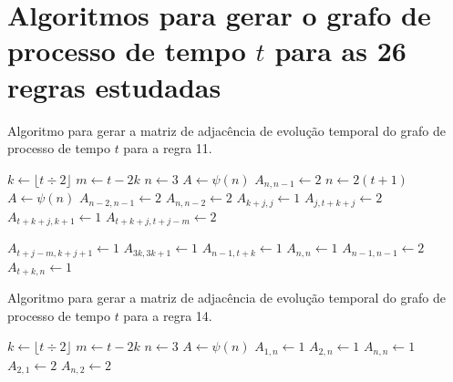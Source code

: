 \documentclass[12pt,a4paper]{article}
\begin{document}
\newpage

\def\refname{Referências bibliográficas}



\appendix
\section{Algoritmos para gerar o grafo de processo de tempo $t$ para as 26 regras
estudadas}\label{sec:algorithms}

\begin{algorithm}[H]
\caption{Algoritmo para gerar a matriz de adjacência de evolução temporal do
grafo de processo de tempo $t$ para a regra 11.}
\label{alg:r11}
\begin{algorithmic}
\STATE $k \leftarrow \lfloor t \div 2 \rfloor$
\STATE $m \leftarrow t-2k$
    \STATE $n \leftarrow 3$
    \STATE $A \leftarrow \psi(n)$
    \STATE $A_{n,n-1} \leftarrow 2$
\ELSE
    \STATE $n \leftarrow 2(t+1)$
    \STATE $A \leftarrow \psi(n)$
    \STATE $A_{n-2,n-1} \leftarrow 2$
    \STATE $A_{n,n-2} \leftarrow 2$
        \STATE $A_{k+j,j} \leftarrow 1$
        \STATE $A_{j,t+k+j} \leftarrow 2$
    \ENDFOR
        \STATE $A_{t+k+j,k+1} \leftarrow 1$
    \ENDFOR
            \STATE $A_{t+k+j,t+j-m} \leftarrow 2$
        \ENDFOR
    \ENDIF
{}
\end{algorithmic}
\end{algorithm}

\begin{algorithm}[H]
\begin{algorithmic}
            \STATE $A_{t+j-m,k+j+1} \leftarrow 1$
        \ENDFOR
    \ENDIF
        \STATE $A_{3k,3k+1} \leftarrow 1$
    \ENDIF
\ENDIF
\STATE $A_{n-1,t+k} \leftarrow 1$
\STATE $A_{n,n} \leftarrow 1$
\STATE $A_{n-1,n-1} \leftarrow 2$
\STATE $A_{t+k,n} \leftarrow 1$
\end{algorithmic}
\end{algorithm}

\begin{algorithm}[H]
\caption{Algoritmo para gerar a matriz de adjacência de evolução temporal do
grafo de processo de tempo $t$ para a regra 14.}
\label{alg:r14}
\begin{algorithmic}
\STATE $k \leftarrow \lfloor t \div 2 \rfloor$
\STATE $m \leftarrow t-2k$
    \STATE $n \leftarrow 3$
    \STATE $A \leftarrow \psi(n)$
    \STATE $A_{1,n} \leftarrow 1$
    \STATE $A_{2,n} \leftarrow 1$
    \STATE $A_{n,n} \leftarrow 1$
    \STATE $A_{2,1} \leftarrow 2$
    \STATE $A_{n,2} \leftarrow 2$
\ELSE
{}
\end{algorithmic}
\end{algorithm}
\end{document}
